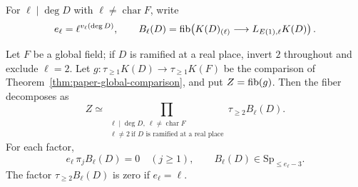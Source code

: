 For $\ell\mid \deg D$ with $\ell\ne\operatorname{char}F$, write
\[
 e_\ell=\ell^{v_\ell(\deg D)},\qquad
 B_\ell(D)=\operatorname{fib}\!\left(K(D)_{(\ell)}\longrightarrow L_{E(1),\ell}K(D)\right).
\]

\begin{theorem}\label{thm:paper-global-fiber-bounds}
Let $F$ be a global field; if $D$ is ramified at a real place, invert $2$ throughout and exclude $\ell=2$.
Let $g\colon\tau_{\ge1}K(D)\to\tau_{\ge1}K(F)$ be the comparison of Theorem~\ref{thm:paper-global-comparison}, and put $Z=\operatorname{fib}(g)$.
Then the fiber decomposes as
\begin{equation}\label{eq:paper-global-fiber-primes}
 Z\simeq
 \prod_{\substack{\ell\mid \deg D,\ \ell\ne\operatorname{char}F\\
                  \ell\ne2\ \text{if $D$ is ramified at a real place}}}
       \tau_{\ge2}B_\ell(D).
\end{equation}
For each factor,
\begin{equation}\label{eq:paper-global-fiber-amplitude}
 e_\ell\,\pi_j B_\ell(D)=0\quad (j\ge1),
 \qquad
 B_\ell(D)\in\mathrm{Sp}_{\le e_\ell-3}.
\end{equation}
The factor $\tau_{\ge2}B_\ell(D)$ is zero if $e_\ell=\ell$.
\end{theorem}

